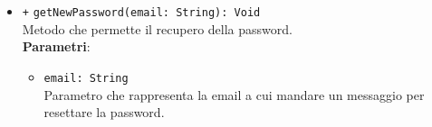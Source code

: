 \begin{itemize}
\begin{itemize}
		\item \texttt{+} \texttt{getNewPassword(email: String): Void}  \\Metodo che permette il recupero della password. \\
			\textbf{Parametri}:
			\begin{itemize}
				\item \texttt{email: String} \\ Parametro che rappresenta la email a cui mandare un messaggio per resettare la password.
			\end{itemize}
	\end{itemize}
\end{itemize}